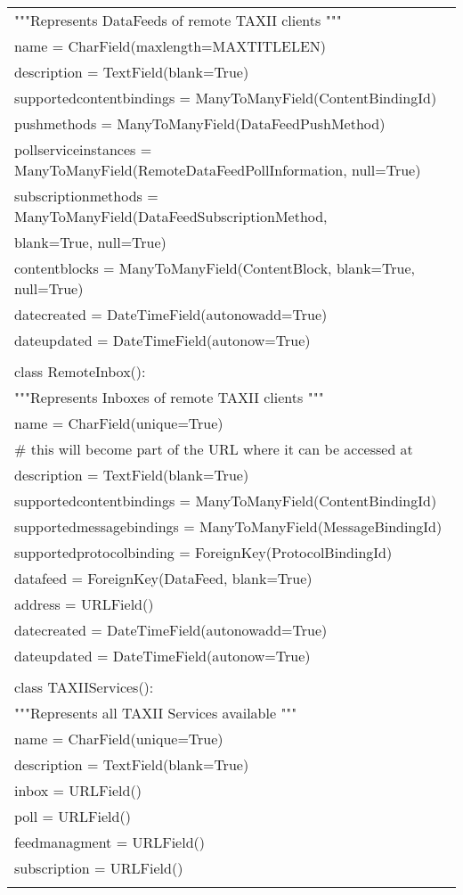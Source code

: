 \begin{center}
\begin{longtable}{|l|}
	    """Represents DataFeeds of remote TAXII clients """\\
	    name = CharField(maxlength=MAXTITLELEN)\\
	    description = TextField(blank=True)\\
	    supportedcontentbindings = ManyToManyField(ContentBindingId)\\
	    pushmethods = ManyToManyField(DataFeedPushMethod)\\
	    pollserviceinstances = ManyToManyField(RemoteDataFeedPollInformation, null=True)\\
	    subscriptionmethods = ManyToManyField(DataFeedSubscriptionMethod, \\
	    blank=True, null=True)\\
	    contentblocks = ManyToManyField(ContentBlock, blank=True, null=True)\\
	    datecreated = DateTimeField(autonowadd=True)\\
	    dateupdated = DateTimeField(autonow=True)\\
	\\
	class RemoteInbox():\\
	    """Represents Inboxes of remote TAXII clients """\\
	    name = CharField(unique=True) \\ \# this will become part of the URL where it can be accessed at\\
	    description = TextField(blank=True)\\
	    supportedcontentbindings = ManyToManyField(ContentBindingId)\\
	    supportedmessagebindings = ManyToManyField(MessageBindingId)\\
	    supportedprotocolbinding = ForeignKey(ProtocolBindingId)\\
	    datafeed = ForeignKey(DataFeed, blank=True)\\
	    address = URLField()\\
	    datecreated = DateTimeField(autonowadd=True)\\
	    dateupdated = DateTimeField(autonow=True)\\
	\\
	class TAXIIServices():\\
	    """Represents all TAXII Services available """\\
	    name = CharField(unique=True)\\
	    description = TextField(blank=True)\\
	    inbox = URLField()\\
	    poll = URLField()\\
	    feedmanagment = URLField()\\
	    subscription = URLField()\\
\\

			
			\hline
		\end{longtable}
	\end{center}
	
